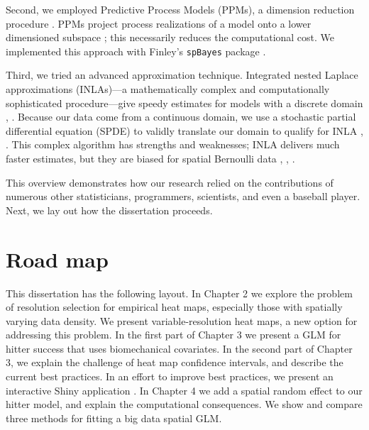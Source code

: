 Second, we employed Predictive Process Models (PPMs), a dimension reduction procedure \citep{Finley2012}. PPMs project process realizations of a model onto a lower dimensioned subspace \citep{Banerjee2008}; this necessarily reduces the computational cost. We implemented this approach with Finley's \verb|spBayes| package \citep{Finley2013}.

Third, we tried an advanced approximation technique. Integrated nested Laplace approximations (INLAs)---a mathematically complex and computationally sophisticated procedure---give speedy estimates for models with a discrete domain \citep{Rue2009}, \citep{Rue2005}. Because our data come from a continuous domain, we use a stochastic partial differential equation (SPDE) to validly translate our domain to qualify for INLA \citep{Lindgren2011}, \citep{Lindstrom2016}. This complex algorithm has strengths and weaknesses; INLA delivers much faster estimates, but they are biased for spatial Bernoulli data \citep{Mondal2017}, \citep{Simpson2012b}, \citep{Rue2009}.

This overview demonstrates how our research relied on the contributions of numerous other statisticians, programmers, scientists, and even a baseball player. Next, we lay out how the dissertation proceeds.

\section{Road map}

This dissertation has the following layout. In Chapter 2 we explore the problem of resolution selection for empirical heat maps, especially those with spatially varying data density. We present variable-resolution heat maps, a new option for addressing this problem. In the first part of Chapter 3 we present a GLM for hitter success that uses biomechanical covariates. In the second part of Chapter 3, we explain the challenge of heat map confidence intervals, and describe the current best practices. In an effort to improve best practices, we present an interactive Shiny application \citep{Shiny}. In Chapter 4 we add a spatial random effect to our hitter model, and explain the computational consequences. We show and compare three methods for fitting a big data spatial GLM. 

